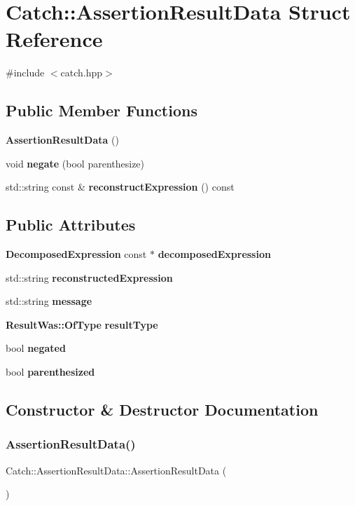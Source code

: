 \section{Catch\+:\+:Assertion\+Result\+Data Struct Reference}
\label{struct_catch_1_1_assertion_result_data}


{\ttfamily \#include $<$catch.\+hpp$>$}

\subsection*{Public Member Functions}
\begin{DoxyCompactItemize}
\item 
\textbf{ Assertion\+Result\+Data} ()
\item 
void \textbf{ negate} (bool parenthesize)
\item 
std\+::string const  \& \textbf{ reconstruct\+Expression} () const
\end{DoxyCompactItemize}
\subsection*{Public Attributes}
\begin{DoxyCompactItemize}
\item 
\textbf{ Decomposed\+Expression} const  $\ast$ \textbf{ decomposed\+Expression}
\item 
std\+::string \textbf{ reconstructed\+Expression}
\item 
std\+::string \textbf{ message}
\item 
\textbf{ Result\+Was\+::\+Of\+Type} \textbf{ result\+Type}
\item 
bool \textbf{ negated}
\item 
bool \textbf{ parenthesized}
\end{DoxyCompactItemize}


\subsection{Constructor \& Destructor Documentation}
\mbox{\label{struct_catch_1_1_assertion_result_data_a37179edde9f853f22d4456677fd97701}} 
\subsubsection{Assertion\+Result\+Data()}
{\footnotesize\ttfamily Catch\+::\+Assertion\+Result\+Data\+::\+Assertion\+Result\+Data (\begin{DoxyParamCaption}{ }\end{DoxyParamCaption})\hspace{0.3cm}{\ttfamily [inline]}}



